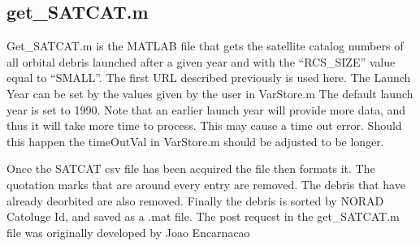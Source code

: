 \documentclass[12pt]{article}
\begin{document}
		\subsection{get\_SATCAT.m}
		Get\_SATCAT.m is the MATLAB file that gets the satellite catalog  numbers of all orbital debris launched after a given year and with the “RCS\_SIZE” value equal to “SMALL”. The first URL described previously is used here. The Launch Year can be set by the values given by the user in VarStore.m The default launch year is set to 1990. Note that an earlier launch year will provide more data, and thus it will take more time to process. This may cause a time out error. Should this happen the timeOutVal in VarStore.m should be adjusted to be longer.\par 
		Once the SATCAT csv file has been acquired the file then formats it. The quotation marks that are around every entry are removed. The debris that have already deorbited are also removed. Finally the debris is sorted by NORAD Catoluge Id, and saved as a .mat file.
		The post request in the get\_SATCAT.m file was originally developed by Joao Encarnacao\cite{codeGETtle}

		
\end{document}
